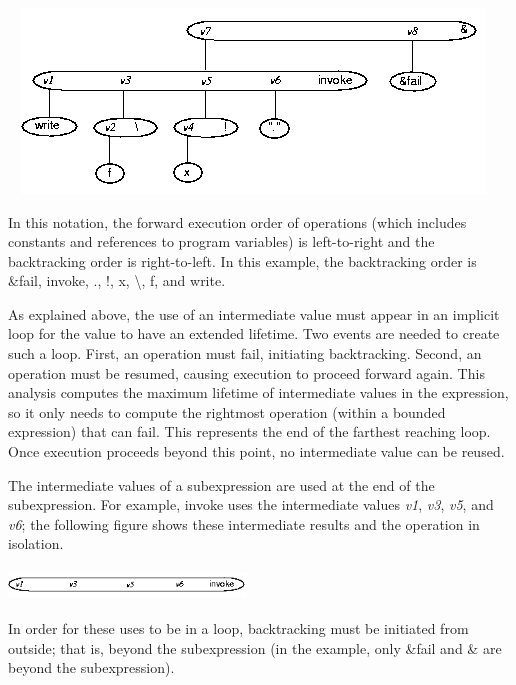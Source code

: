 {\centering\color{green}
 \includegraphics[width=5.1098in,height=1.9366in]{kw/figure4-2.png}  
\par}

In this notation, the forward execution order of operations (which
includes constants and references to program variables) is
left-to-right and the backtracking order is right-to-left. In this
example, the backtracking order is \&fail, invoke,
{\textquotedbl}.{\textquotedbl}, !, x, {\textbackslash}, f, and write.

As explained above, the use of an intermediate value must appear in an
implicit loop for the value to have an extended lifetime. Two events
are needed to create such a loop. First, an operation must fail,
initiating backtracking. Second, an operation must be resumed, causing
execution to proceed forward again. This analysis computes the maximum
lifetime of intermediate values in the expression, so it only needs to
compute the rightmost operation (within a bounded expression) that can
fail. This represents the end of the farthest reaching loop. Once
execution proceeds beyond this point, no intermediate value can be
reused.

The intermediate values of a subexpression are used at the end of the
subexpression. For example, invoke uses the intermediate values
\textit{v1}, \textit{v3}, \textit{v5}, and \textit{v6}; the following
figure shows these intermediate results and the operation in
isolation.

{\centering\color{green}
 \includegraphics[width=2.4937in,height=0.3402in]{kw/figure4-3.png}  
\par}

In order for these uses to be in a loop, backtracking must be
initiated from outside; that is, beyond the subexpression (in the
example, only \&fail and \& are beyond the subexpression).

